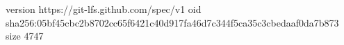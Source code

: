 version https://git-lfs.github.com/spec/v1
oid sha256:05bf45cbc2b8702cc65f6421c40d917fa46d7c344f5ca35c3cbedaaf0da7b873
size 4747
